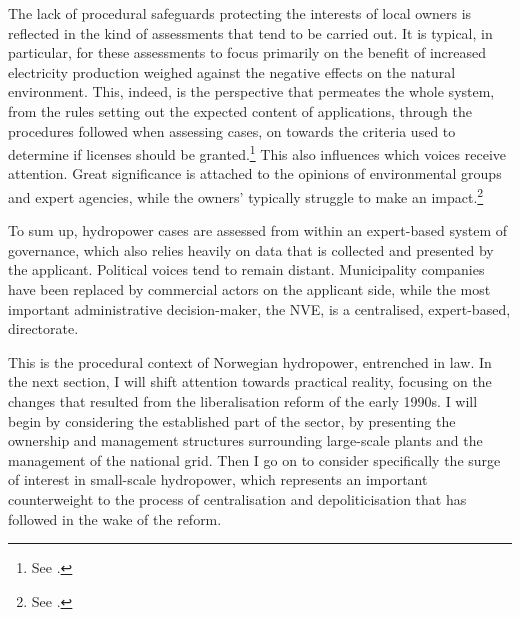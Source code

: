 The lack of procedural safeguards protecting the interests of local owners is reflected in the kind of assessments that tend to be carried out. It is typical, in particular, for these assessments to focus primarily on the benefit of increased electricity production weighed against the negative effects on the natural environment. This, indeed, is the perspective that permeates the whole system, from the rules setting out the expected content of applications, through the procedures followed when assessing cases, on towards the criteria used to determine if licenses should be granted.\footnote{See \cite{stokker10}.} This also influences which voices receive attention. Great significance is attached to the opinions of environmental groups and expert agencies, while the owners' typically struggle to make an impact.\footnote{See \cite{jorpeland11}.}

To sum up, hydropower cases are assessed from within an expert-based system of governance, which also relies heavily on data that is collected and presented by the applicant. Political voices tend to remain distant. Municipality companies have been replaced by commercial actors on the applicant side, while the most important administrative decision-maker, the NVE, is a centralised, expert-based, directorate.

This is the procedural context of Norwegian hydropower, entrenched in law. In the next section, I will shift attention towards practical reality, focusing on the changes that resulted from the liberalisation reform of the early 1990s. I will begin by considering the established part of the sector, by presenting the ownership and management structures surrounding large-scale plants and the management of the national grid. Then I go on to consider specifically the surge of interest in small-scale hydropower, which represents an important counterweight to the process of centralisation and depoliticisation that has followed in the wake of the reform.

%
%
%
%
%
%

